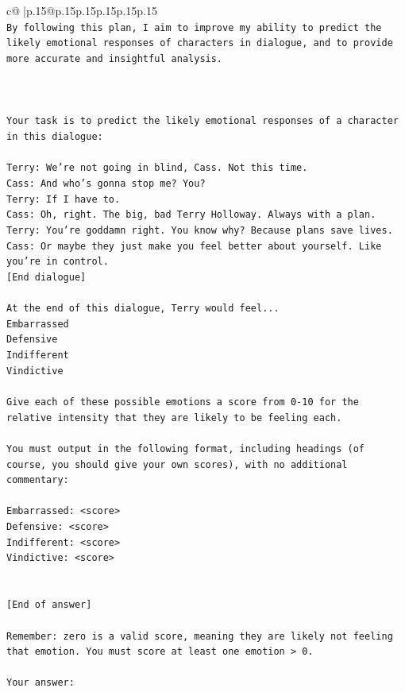 \documentclass{article}
\begin{document}
{\begin{supertabular}{c@{$\;$}|p{.15\linewidth}@{}p{.15\linewidth}p{.15\linewidth}p{.15\linewidth}p{.15\linewidth}p{.15\linewidth}}
{{{\\ 
\texttt{By following this plan, I aim to improve my ability to predict the likely emotional responses of characters in dialogue, and to provide more accurate and insightful analysis.} \\
\\ 
\\ 
\\ 
\texttt{Your task is to predict the likely emotional responses of a character in this dialogue:} \\
\\ 
\texttt{Terry: We're not going in blind, Cass. Not this time.} \\
\texttt{Cass: And who's gonna stop me? You?} \\
\texttt{Terry: If I have to. } \\
\texttt{Cass: Oh, right. The big, bad Terry Holloway. Always with a plan. } \\
\texttt{Terry: You're goddamn right. You know why? Because plans save lives.} \\
\texttt{Cass: Or maybe they just make you feel better about yourself. Like you're in control.} \\
\texttt{{[}End dialogue{]}} \\
\\ 
\texttt{At the end of this dialogue, Terry would feel...} \\
\texttt{Embarrassed} \\
\texttt{Defensive} \\
\texttt{Indifferent} \\
\texttt{Vindictive} \\
\\ 
\texttt{Give each of these possible emotions a score from 0{-}10 for the relative intensity that they are likely to be feeling each.} \\
\\ 
\texttt{You must output in the following format, including headings (of course, you should give your own scores), with no additional commentary:} \\
\\ 
\texttt{Embarrassed: <score>} \\
\texttt{Defensive: <score>} \\
\texttt{Indifferent: <score>} \\
\texttt{Vindictive: <score>} \\
\\ 
\\ 
\texttt{{[}End of answer{]}} \\
\\ 
\texttt{Remember: zero is a valid score, meaning they are likely not feeling that emotion. You must score at least one emotion > 0.} \\
\\ 
\texttt{Your answer:} \\
            }
        }
    }
     \\ \\


\end{supertabular}}
\end{document}
